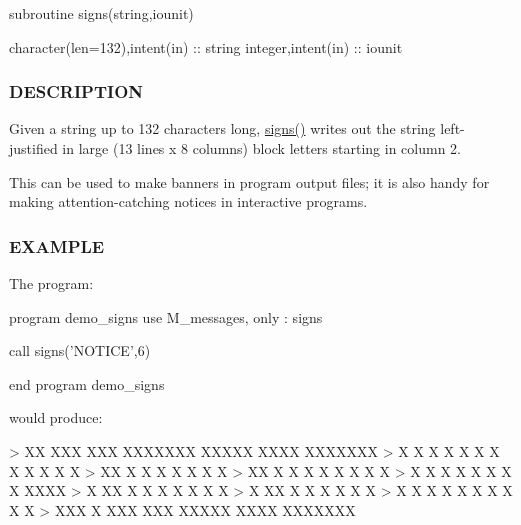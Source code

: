 \begin{DoxyVerb} subroutine signs(string,iounit)

  character(len=132),intent(in)  :: string
  integer,intent(in)             :: iounit
\end{DoxyVerb}


\subsubsection*{D\+E\+S\+C\+R\+I\+P\+T\+I\+ON}

Given a string up to 132 characters long, \hyperlink{namespacem__messages_a239cb1269cc27d45176b9a278276d399}{signs()} writes out the string left-\/justified in large (13 lines x 8 columns) block letters starting in column 2.

This can be used to make banners in program output files; it is also handy for making attention-\/catching notices in interactive programs.

\subsubsection*{E\+X\+A\+M\+P\+LE}

\begin{DoxyVerb} The program:

    program demo_signs
    use M_messages, only : signs

    call signs('NOTICE',6)

    end program demo_signs

 would produce:

  > XX  XXX   XXX   XXXXXXX  XXXXX    XXXX  XXXXXXX
  >  X   X   X   X  X  X  X    X     X    X  X    X
  >  XX  X  X     X    X       X    X        X
  >  XX  X  X     X    X       X    X        X  X
  >  X X X  X     X    X       X    X        XXXX
  >  X  XX  X     X    X       X    X        X  X
  >  X  XX  X     X    X       X    X        X
  >  X   X   X   X     X       X     X    X  X    X
  > XXX  X    XXX     XXX    XXXXX    XXXX  XXXXXXX \end{DoxyVerb}



